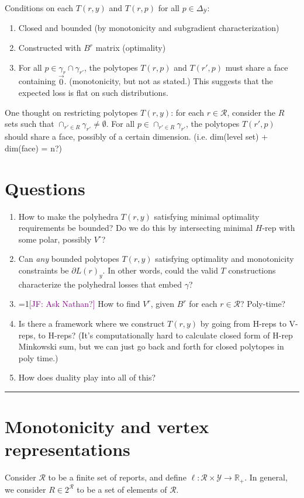 \documentclass[12pt]{article}
\newcommand{\Comments}{1}
\newcommand{\mynote}[2]{\ifnum\Comments=1\textcolor{#1}{#2}\fi}
\newcommand{\jessie}[1]{\mynote{purple}{[JF: #1]}}
\newcommand{\reals}{\mathbb{R}}
\newcommand{\simplex}{\Delta_\Y}
\newcommand{\R}{\mathcal{R}}
\newcommand{\Y}{\mathcal{Y}}
\begin{document}
Conditions on each $T(r,y)$ and $T(r,p)$ for all $p \in \simplex$:
\begin{enumerate}
	\item Closed and bounded (by monotonicity and subgradient characterization)
	\item Constructed with $B^r$ matrix (optimality)
	\item For all $p \in \gamma_r \cap \gamma_{r'}$, the polytopes $T(r,p)$ and $T(r',p)$ must share a face containing $\vec 0$. (monotonicity, but not as stated.)
	This suggests that the expected loss is flat on such distributions.
\end{enumerate}

One thought on restricting polytopes $T(r,y)$: for each $r \in \R$, consider the $R$ sets such that $\cap_{r' \in R} \gamma_{r'} \neq \emptyset$.
For all $p \in \cap_{r' \in R}\gamma_{r'}$, the polytopes $T(r',p)$ should share a face, possibly of a certain dimension.  (i.e. dim(level set) + dim(face) = n?) 

\section*{Questions}
\begin{enumerate}
	\item How to make the polyhedra $T(r,y)$ satisfying minimal optimality requirements be bounded? Do we do this by intersecting minimal $H$-rep with some polar, possibly $V^\circ$? 
	\item Can \emph{any} bounded polytopes $T(r,y)$ satisfying optimality and monotonicity constraints be $\partial L(r)_y$.  In other words, could the valid $T$ constructions characterize the polyhedral losses that embed $\gamma$?
	\item \jessie{Ask Nathan?} How to find $V^r$, given $B^r$ for each $r \in \R$?  Poly-time?
	\item Is there a framework where we construct $T(r,y)$ by going from H-reps to V-reps, to H-reps?  (It's computationally hard to calculate closed form of H-rep Minkowski sum, but we can just go back and forth for closed polytopes in poly time.)
	\item How does duality play into all of this?  
\end{enumerate}

\bigskip \hrule \bigskip

\section{Monotonicity and vertex representations}
Consider $\R$ to be a finite set of reports, and define $\ell:\R \times \Y \to \reals_+$.
In general, we consider $R \in 2^\R$ to be a set of elements of $\R$.
\end{document}
